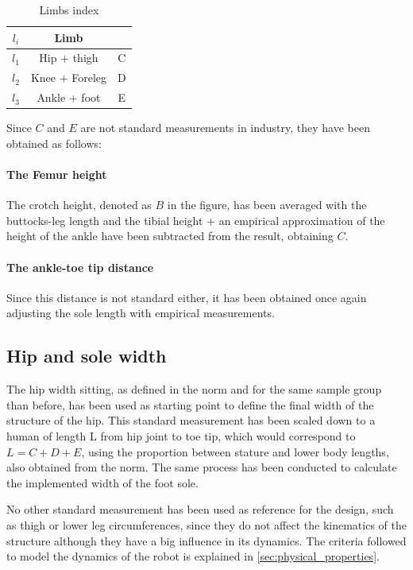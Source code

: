 \begin{table}
\begin{center}
	\begin{tabular}{c | c | c}
	  $l_{i}$ & Limb \\
	  \hline
	  $l_{1}$ & Hip + thigh & C \\
	  $l_{2}$ & Knee + Foreleg & D\\
	  $l_{3}$ & Ankle + foot & E 
	\end{tabular}
	\caption{Limbs index}
	\label{tab:limb_index}
\end{center}
\end{table}

Since $C$ and $E$ are not standard measurements in industry, they have been obtained as follows:

\paragraph{The Femur height}
The crotch height, denoted as $B$ in the figure, has been averaged with the buttocks-leg length and the tibial height + an empirical approximation of the height of the ankle have been subtracted from the result, obtaining $C$.

\paragraph{The ankle-toe tip distance}
Since this distance is not standard either, it has been obtained once again adjusting the sole length with empirical measurements.

\subsection{Hip and sole width} %
\label{sub:subsection_name}
The hip width sitting, as defined in the norm and for the same sample group than before, has been used as starting point to define the final width of the structure of the hip.
This standard measurement has been scaled down to a human of length L from hip joint to toe tip, which would correspond to $L=C+D+E$, using the proportion between stature and lower body lengths, also obtained from the norm.
The same process has been conducted to calculate the implemented width of the foot sole.


No other standard measurement has been used as reference for the design, such as thigh or lower leg circumferences, since they do not affect the kinematics of the structure although they have a big influence in its dynamics.
The criteria followed to model the dynamics of the robot is explained in \ref{sec:physical_properties}.




